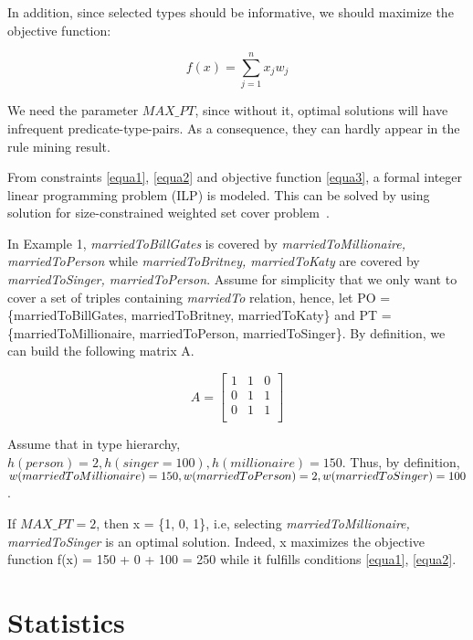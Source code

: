 In addition, since selected types should be informative, we should maximize the objective function:

\begin{equation}
\label{equa3}
f(x) = \sum_{j=1}^{n}{x_{j} w_{j}}
\end{equation}

We need the parameter $MAX\_PT$, since without it, optimal solutions will have infrequent predicate-type-pairs. As a consequence, they can hardly appear in the rule mining result.

From constraints \ref{equa1}, \ref{equa2} and objective function \ref{equa3}, a formal integer linear programming problem (ILP) is modeled. This can be solved by using solution for size-constrained weighted set cover problem~\cite{ref3}.

\begin{example}
In Example 1, \textit{marriedToBillGates} is covered by \textit{marriedToMillionaire, marriedToPerson} while \textit{marriedToBritney, marriedToKaty} are covered by \textit{marriedToSinger, marriedToPerson}. Assume for simplicity that we only want to cover a set of triples containing \textit{marriedTo} relation, hence, let PO = \{marriedToBillGates, marriedToBritney, marriedToKaty\} and PT = \{marriedToMillionaire, marriedToPerson, marriedToSinger\}. By definition, we can build the following matrix A.

\[
A
=
\begin{bmatrix}
1 & 1 & 0\\
0 & 1 & 1\\
0 & 1 & 1\\
\end{bmatrix}
\]

Assume that in type hierarchy, $h(person) = 2, h(singer = 100), h(millionaire) = 150$. Thus, by definition, $w(married\\ToMillionaire) = 150, w(marriedToPerson) = 2, \\w(marriedToSinger) = 100$.

If $MAX\_PT = 2$, then x = \{1, 0, 1\}, i.e, selecting \textit{marriedToMillionaire, marriedToSinger} is an optimal solution. Indeed, x maximizes the objective function f(x) = 150 + 0 + 100 = 250 while it fulfills conditions \ref{equa1}, \ref{equa2}.
\end{example}

\section{Statistics}
\label{section3}

